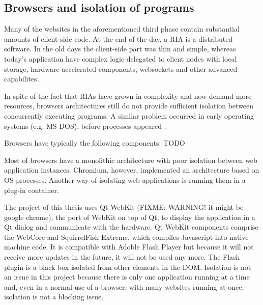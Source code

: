 \subsection{Browsers and isolation of programs}    
Many of the websites in the aforementioned third phase contain substantial amounts of client-side code. At the end of the day, a \ac{RIA} is a distributed software. 
In the old days the client-side part was thin and simple, whereas today's application have complex logic delegated to client nodes with local storage, hardware-accelerated components, websockets and other advanced capabilites.

In spite of the fact that \acp{RIA} have grown in complexity and now demand more resources, browsers architectures still do not provide sufficient isolation between concurrently executing programs.
A similar problem occurred in early operating systems (e.g. MS-DOS), before processes appeared \cite{Reis:2009}. 

Browsers have typically the following components: TODO

Most of browsers have a monolithic architecture with poor isolation between web application instances. Chromium, however, implemented an architecture based on \ac{OS} processes. 
Another way of isolating web applications is running them in a plug-in container. 

The project of this thesis uses Qt WebKit (FIXME: WARNING! it might be google chrome), the port of WebKit on top of Qt, to display the application in a Qt dialog and communicate with the hardware. 
Qt WebKit components comprise the WebCore and SquirrelFish Extreme, which compiles Javascript into native machine code. 
It is compatible with Adoble Flash Player but because it will not receive more updates in the future, it will not be used any more.
The Flash plugin is a black box isolated from other elements in the \ac{DOM}.
Isolation is not an issue in this project because there is only one application running at a time and, even in a normal use of a browser, with many websites running at once, isolation is not a blocking issue.


